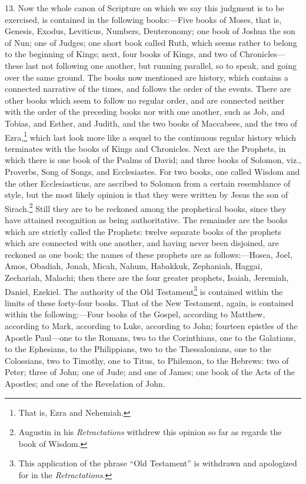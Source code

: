 13. Now the whole canon of Scripture on which we say this judgment is to be exercised, is contained in the following books:—Five books of Moses, that is, Genesis, Exodus, Leviticus, Numbers, Deuteronomy; one book of Joshua the son of Nun; one of Judges; one short book called Ruth, which seems rather to belong to the beginning of Kings; next,  four books of Kings, and two of Chronicles—these last not following one another, but running parallel, so to speak, and going over the same ground. The books now mentioned are history, which contains a connected narrative of the times, and follows the order of the events. There are other books which seem to follow no regular order, and are connected neither with the order of the preceding books nor with one another, such as Job, and Tobias, and Esther, and Judith, and the two books of Maccabees, and the two of Ezra,\footnote{That is, Ezra and Nehemiah.} which last look more like a sequel to the continuous regular history which terminates with the books of Kings and Chronicles. Next are the Prophets, in which there is one book of the Psalms of David; and three books of Solomon, viz., Proverbs, Song of Songs, and Ecclesiastes. For two books, one called Wisdom and the other Ecclesiasticus, are ascribed to Solomon from a certain resemblance of style, but the most likely opinion is that they were written by Jesus the son of Sirach.\footnote{Augustin in his \emph{ Retractations} withdrew this opinion so far as regards the book of Wisdom.} Still they are to be reckoned among the prophetical books, since they have attained recognition as being authoritative. The remainder are the books which are strictly called the Prophets: twelve separate books of the prophets which are connected with one another, and having never been disjoined, are reckoned as one book; the names of these prophets are as follows:—Hosea, Joel, Amos, Obadiah, Jonah, Micah, Nahum, Habakkuk, Zephaniah, Haggai, Zechariah, Malachi; then there are the four greater prophets, Isaiah, Jeremiah, Daniel, Ezekiel. The authority of the Old Testament\footnote{This application of the phrase “Old Testament” is withdrawn and apologized for in the \emph{ Retractations}.} is contained within the limits of these forty-four books. That of the New Testament, again, is contained within the following:—Four books of the Gospel, according to Matthew, according to Mark, according to Luke, according to John; fourteen epistles of the Apostle Paul—one to the Romans, two to the Corinthians, one to the Galatians, to the Ephesians, to the Philippians, two to the Thessalonians, one to the Colossians, two to Timothy, one to Titus, to Philemon, to the Hebrews: two of Peter; three of John; one of Jude; and one of James; one book of the Acts of the Apostles; and one of the Revelation of John.

